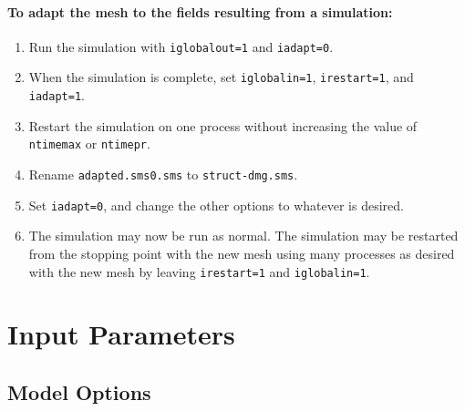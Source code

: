 \documentclass[letterpaper]{book}
\begin{document}
\paragraph{To adapt the mesh to the fields resulting from a simulation:}
\begin{enumerate}
\item Run the simulation with \texttt{iglobalout=1} and
  \texttt{iadapt=0}.
\item When the simulation is complete, set \texttt{iglobalin=1},
  \texttt{irestart=1}, and \texttt{iadapt=1}.
\item Restart the simulation on one process without increasing the
  value of \texttt{ntimemax} or \texttt{ntimepr}.
\item Rename \texttt{adapted.sms0.sms} to \texttt{struct-dmg.sms}.
\item Set \texttt{iadapt=0}, and change the other
  options to whatever is desired.
\item The simulation may now be run as normal.  The simulation may be
  restarted from the stopping point with the new mesh using many
  processes as desired with the new mesh by leaving
  \texttt{irestart=1} and \texttt{iglobalin=1}.
\end{enumerate}






\section{Input Parameters}
\label{sec:input_parameters}

\subsection{Model Options}
\end{document}
